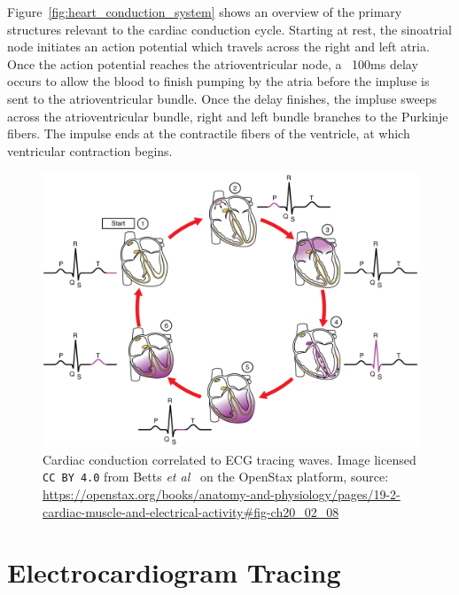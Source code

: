 \documentclass[\main/thesis.tex]{subfiles}
\begin{document}
Figure~\ref{fig:heart_conduction_system} shows an overview of the primary structures relevant to the cardiac conduction cycle.
Starting at rest, the sinoatrial node initiates an action potential which travels across the right and left atria.
Once the action potential reaches the atrioventricular node, a ~100ms delay occurs to allow the blood to finish pumping by the atria before the impluse is sent to the atrioventricular bundle.
Once the delay finishes, the impluse sweeps across the atrioventricular bundle, right and left bundle branches to the Purkinje fibers.
The impulse ends at the contractile fibers of the ventricle, at which ventricular contraction begins.

\begin{figure}[hb]
    \centering
    \includegraphics[width=13cm]{figure/pqrst_with_heart_conduction_system.jpeg}
    \caption[Cardiac conduction correlated to ECG tracing waves.]{Cardiac conduction correlated to ECG tracing waves.
    Image licensed \texttt{CC BY 4.0} from Betts \emph{et al}~\cite{betts-anatomy-and-physiology} on the OpenStax platform, source: \url{https://openstax.org/books/anatomy-and-physiology/pages/19-2-cardiac-muscle-and-electrical-activity\#fig-ch20_02_08}}
\end{figure}

\section{Electrocardiogram Tracing}
\end{document}
